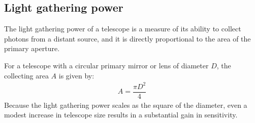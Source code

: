	\subsection{Light gathering power}
		The light gathering power of a telescope is a measure of its ability to collect photons from a distant source, and it is directly proportional to the area of the primary aperture.
		
		For a telescope with a circular primary mirror or lens of diameter $D$, the collecting area $A$ is given by:
		\begin{align*}
			A=\dfrac{\pi D^2}{4}
		\end{align*}
		Because the light gathering power scales as the square of the diameter, even a modest increase in telescope size results in a substantial gain in sensitivity.